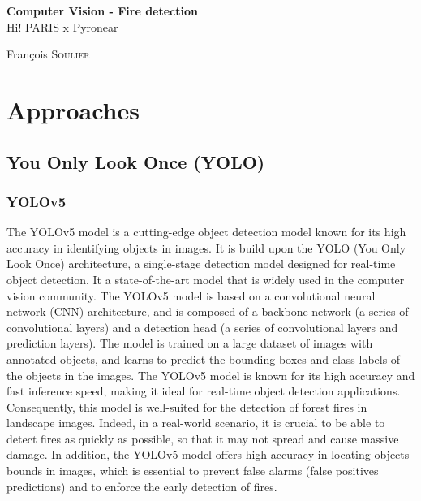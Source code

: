 \documentclass{article}
\begin{document}
\begin{titlepage}
\begin{center}


{ {\huge \bfseries Computer Vision - Fire detection}\\[0.4cm]
    \LARGE Hi! PARIS x Pyronear}

\vfill

\begin{minipage}{0.5\textwidth}
    \large
    \centering
    François \textsc{Soulier}
\end{minipage}

\end{center}
\end{titlepage}

\tableofcontents
\thispagestyle{empty}
\newpage
\setcounter{page}{1}

\section{Approaches}

\subsection{You Only Look Once (YOLO)}

\subsubsection{YOLOv5}

The YOLOv5 model is a cutting-edge object detection model known for its high accuracy in identifying objects in images. It is build upon the YOLO (You Only Look Once) architecture, a single-stage detection model designed for real-time object detection. It a state-of-the-art model that is widely used in the computer vision community. The YOLOv5 model is based on a convolutional neural network (CNN) architecture, and is composed of a backbone network (a series of convolutional layers) and a detection head (a series of convolutional layers and prediction layers). The model is trained on a large dataset of images with annotated objects, and learns to predict the bounding boxes and class labels of the objects in the images. The YOLOv5 model is known for its high accuracy and fast inference speed, making it ideal for real-time object detection applications.\\

Consequently, this model is well-suited for the detection of forest fires in landscape images. Indeed, in a real-world scenario, it is crucial to be able to detect fires as quickly as possible, so that it may not spread and cause massive damage.
In addition, the YOLOv5 model offers high accuracy in locating objects bounds in images, which is essential to prevent false alarms (false positives predictions) and to enforce the early detection of fires.
\end{document}
